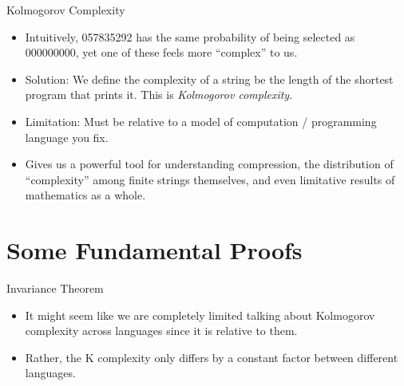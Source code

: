 \documentclass[aspectratio=169]{beamer}
\begin{document}
\begin{frame}{Kolmogorov Complexity}
  
  \begin{itemize}
    \item Intuitively, 057835292 has the same probability of being selected as 000000000, yet one of these feels more ``complex'' to us. \pause
    \item Solution: We define the complexity of a string be the length of the shortest program that prints it. This is \emph{Kolmogorov complexity}. \pause
    \item Limitation: Must be relative to a model of computation / programming language you fix. \pause
    \item Gives us a powerful tool for understanding compression, the distribution of ``complexity'' among finite strings themselves, and even limitative results of mathematics as a whole.
  \end{itemize}
\end{frame}

\section{Some Fundamental Proofs}
\frame{\sectionpage}

\begin{frame}{Invariance Theorem}
  
  \begin{itemize}
    \item It might seem like we are completely limited talking about Kolmogorov complexity across languages since it is relative to them. \pause
    \item Rather, the K complexity only differs by a constant factor between different languages.
  \end{itemize}
\end{frame}
\end{document}
